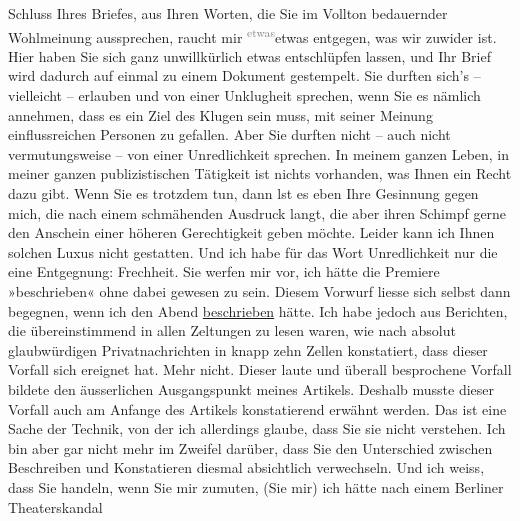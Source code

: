 \begin{ledgroupsized}[t]{13cm}
               Schluss Ihres Briefes, aus Ihren Worten, die Sie im Vollton bedauernder Wohlmeinung
               aussprechen, raucht mir \substVorne{}\textsuperscript{\textcolor{gray}{etwas}}\substDazwischen{}etwas\substHinten{} entgegen, was wir zuwider ist. Hier haben Sie sich ganz unwillkürlich etwas
               entschlüpfen lassen, und Ihr Brief wird dadurch auf einmal zu einem Dokument
               gestempelt.\pend
           \pstart
           Sie durften sich’s – vielleicht – erlauben und von einer Unklugheit sprechen, wenn
               Sie es nämlich annehmen, dass es ein Ziel des Klugen sein muss, mit seiner Meinung
               einflussreichen Personen zu gefallen. Aber Sie durften nicht – auch nicht
               vermutungsweise – von einer Unredlichkeit sprechen. In meinem ganzen Leben, in mei{\pb}ner ganzen publizistischen
               Tätigkeit ist nichts vorhanden, was Ihnen ein Recht dazu gibt. Wenn Sie es trotzdem
               tun, dann lst es eben Ihre Gesinnung gegen mich, die nach einem schmähenden Ausdruck
               langt, die aber ihren Schimpf gerne den Anschein einer höheren Gerechtigkeit geben
               möchte. Leider kann ich Ihnen solchen Luxus nicht gestatten. Und ich habe für das
               Wort Unredlichkeit nur die eine Entgegnung: Frechheit.\pend
           \pstart
           Sie werfen mir vor, ich hätte die Premiere »beschrieben« ohne dabei gewesen zu sein.
               Diesem Vorwurf liesse sich selbst dann begegnen, wenn ich den Abend \uline{beschrieben} hätte. Ich habe jedoch aus Berichten, die
               übereinstimmend in allen Zeltungen zu lesen waren, wie nach absolut glaubwürdigen
               Privatnachrichten in knapp zehn Zellen konstatiert, dass dieser Vorfall sich ereignet
               hat. Mehr nicht. Dieser laute und überall besprochene Vorfall bildete den
               äusserlichen Ausgangspunkt meines Artikels. Deshalb musste dieser Vorfall auch am
               Anfange des Artikels konstatierend erwähnt werden. Das ist eine Sache der Technik,
               von der ich allerdings glaube, dass Sie sie nicht verstehen. Ich bin aber gar nicht
               mehr im Zweifel darüber, dass Sie den Unterschied zwischen Beschreiben und
               Konstatieren diesmal absichtlich verwechseln. Und ich weiss, dass Sie \label{K_L03438-22v}\label{K_L03438-22h} handeln, wenn Sie mir zumuten, (Sie
               mir) ich hätte nach einem Berliner Theaterskandal

\end{ledgroupsized}
